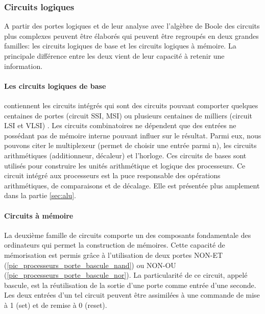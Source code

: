 \subsubsection{Circuits logiques}
A partir des portes logiques et de leur analyse avec l'algèbre de Boole des circuits plus complexes peuvent être élaborés qui peuvent être regroupés en deux grandes familles: les circuits logiques de base  et les circuits logiques à mémoire. La principale différence entre les deux vient de leur capacité à retenir une information. 

\paragraph{Les circuits logiques de base}
contiennent les circuits intégrés qui sont des circuits pouvant comporter quelques centaines de portes (circuit SSI, MSI) ou plusieurs centaines de milliers (circuit LSI et VLSI) \cite{barbe2013very}.
Les circuits combinatoires ne dépendent que des entrées ne possédant pas de mémoire interne pouvant influer sur le résultat. Parmi eux, nous pouvons citer le multiplexeur (permet de choisir une entrée parmi n), les circuits arithmétiques (additionneur, décaleur) et l'horloge. 
Ces circuits de bases sont utilisés pour construire les unités arithmétique et logique des processeurs. Ce circuit intégré aux processeurs est la puce responsable des opérations arithmétiques, de comparaisons et de décalage. Elle est présentée plus amplement dans la partie \autoref{sec:alu}.


\paragraph{Circuits à mémoire}
La deuxième famille de circuits comporte un des composants fondamentale des ordinateurs qui permet la construction de mémoires. Cette capacité de mémorisation est permis grâce à l'utilisation de deux portes NON-ET (\autoref{pic_processeurs_porte_bascule_nand}) ou NON-OU (\autoref{pic_processeurs_porte_bascule_nor}). La particularité de ce circuit, appelé bascule, est la réutilisation de la sortie d'une porte comme entrée d'une seconde. 
Les deux entrées d'un tel circuit peuvent être assimilées à une commande de mise à 1 (set) et de remise à 0 (reset).

